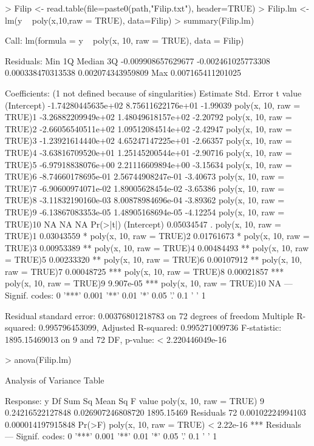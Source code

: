 \documentclass[10pt]{article}
\begin{document}
\begin{Schunk}
\begin{Sinput}
> Filip <- read.table(file=paste0(path,"Filip.txt"), header=TRUE)
> Filip.lm <- lm(y ~ poly(x,10,raw = TRUE), data=Filip)
> summary(Filip.lm)
\end{Sinput}
\begin{Soutput}
Call:
lm(formula = y ~ poly(x, 10, raw = TRUE), data = Filip)

Residuals:
               Min                 1Q             Median                 3Q 
-0.009908657629677 -0.002461025773308  0.000338470313538  0.002074343959809 
               Max 
 0.007165411201025 

Coefficients: (1 not defined because of singularities)
                                    Estimate         Std. Error  t value
(Intercept)               -1.74280445635e+02  8.75611622176e+01 -1.99039
poly(x, 10, raw = TRUE)1  -3.26882209949e+02  1.48049618157e+02 -2.20792
poly(x, 10, raw = TRUE)2  -2.66056540511e+02  1.09512084514e+02 -2.42947
poly(x, 10, raw = TRUE)3  -1.23921614440e+02  4.65247147225e+01 -2.66357
poly(x, 10, raw = TRUE)4  -3.63816709520e+01  1.25145200544e+01 -2.90716
poly(x, 10, raw = TRUE)5  -6.97918838076e+00  2.21116609894e+00 -3.15634
poly(x, 10, raw = TRUE)6  -8.74660178695e-01  2.56744908247e-01 -3.40673
poly(x, 10, raw = TRUE)7  -6.90600974071e-02  1.89005628454e-02 -3.65386
poly(x, 10, raw = TRUE)8  -3.11832190160e-03  8.00878984696e-04 -3.89362
poly(x, 10, raw = TRUE)9  -6.13867083353e-05  1.48905168694e-05 -4.12254
poly(x, 10, raw = TRUE)10                 NA                 NA       NA
                            Pr(>|t|)    
(Intercept)               0.05034547 .  
poly(x, 10, raw = TRUE)1  0.03043559 *  
poly(x, 10, raw = TRUE)2  0.01761673 *  
poly(x, 10, raw = TRUE)3  0.00953389 ** 
poly(x, 10, raw = TRUE)4  0.00484493 ** 
poly(x, 10, raw = TRUE)5  0.00233320 ** 
poly(x, 10, raw = TRUE)6  0.00107912 ** 
poly(x, 10, raw = TRUE)7  0.00048725 ***
poly(x, 10, raw = TRUE)8  0.00021857 ***
poly(x, 10, raw = TRUE)9   9.907e-05 ***
poly(x, 10, raw = TRUE)10         NA    
---
Signif. codes:  0 '***' 0.001 '**' 0.01 '*' 0.05 '.' 0.1 ' ' 1

Residual standard error: 0.00376801218783 on 72 degrees of freedom
Multiple R-squared:  0.995796453099,	Adjusted R-squared:  0.995271009736 
F-statistic: 1895.15469013 on 9 and 72 DF,  p-value: < 2.220446049e-16
\end{Soutput}
\begin{Sinput}
> anova(Filip.lm)
\end{Sinput}
\begin{Soutput}
Analysis of Variance Table

Response: y
                        Df           Sum Sq           Mean Sq    F value
poly(x, 10, raw = TRUE)  9 0.24216522127848 0.026907246808720 1895.15469
Residuals               72 0.00102224994103 0.000014197915848           
                            Pr(>F)    
poly(x, 10, raw = TRUE) < 2.22e-16 ***
Residuals                             
---
Signif. codes:  0 '***' 0.001 '**' 0.01 '*' 0.05 '.' 0.1 ' ' 1
\end{Soutput}
\end{Schunk}
\end{document}
